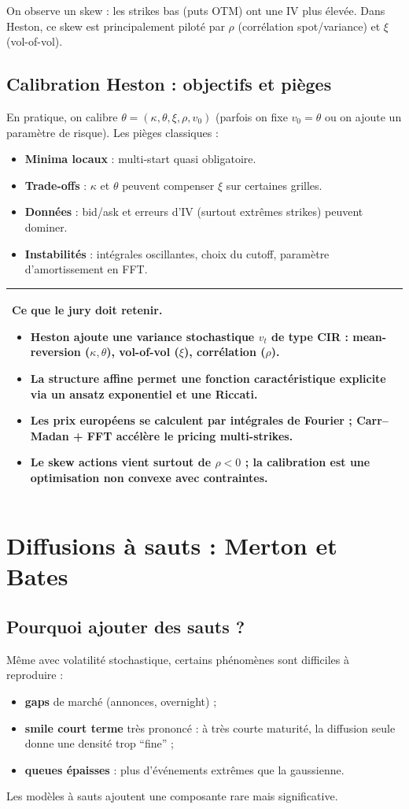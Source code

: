 \documentclass[11pt,a4paper]{report}
\newcommand{\1}{\mathbbm{1}}
\theoremstyle{definition}
\theoremstyle{plain}
\theoremstyle{remark}
\newenvironment{jurybox}{%
  \begin{center}
  \setlength{\tabcolsep}{6pt}%
  \renewcommand{\arraystretch}{1.1}%
  \begin{tabular}{|p{0.94\textwidth}|}
  \hline
  \small\textbf{Ce que le jury doit retenir.}\par\medskip
}{%
  \\ \hline
  \end{tabular}
  \end{center}
}
\begin{document}
On observe un skew : les strikes bas (puts OTM) ont une IV plus élevée.
Dans Heston, ce skew est principalement piloté par $\rho$ (corrélation spot/variance) et $\xi$ (vol-of-vol).

\section{Calibration Heston : objectifs et pièges}
En pratique, on calibre $\theta=(\kappa,\theta,\xi,\rho,v_0)$ (parfois on fixe $v_0=\theta$ ou on ajoute un paramètre de risque).
Les pièges classiques :
\begin{itemize}
  \item \textbf{Minima locaux} : multi-start quasi obligatoire.
  \item \textbf{Trade-offs} : $\kappa$ et $\theta$ peuvent compenser $\xi$ sur certaines grilles.
  \item \textbf{Données} : bid/ask et erreurs d'IV (surtout extrêmes strikes) peuvent dominer.
  \item \textbf{Instabilités} : intégrales oscillantes, choix du cutoff, paramètre d'amortissement en FFT.
\end{itemize}

\begin{jurybox}
\begin{itemize}
\item Heston ajoute une variance stochastique $v_t$ de type CIR : mean-reversion ($\kappa,\theta$), vol-of-vol ($\xi$), corrélation ($\rho$).
\item La structure affine permet une fonction caractéristique explicite via un ansatz exponentiel et une Riccati.
\item Les prix européens se calculent par intégrales de Fourier ; Carr--Madan + FFT accélère le pricing multi-strikes.
\item Le skew actions vient surtout de $\rho<0$ ; la calibration est une optimisation non convexe avec contraintes.
\end{itemize}
\end{jurybox}

\chapter{Diffusions à sauts : Merton et Bates}
\label{chap:jumps}

\section{Pourquoi ajouter des sauts ?}
Même avec volatilité stochastique, certains phénomènes sont difficiles à reproduire :
\begin{itemize}
  \item \textbf{gaps} de marché (annonces, overnight) ;
  \item \textbf{smile court terme} très prononcé : à très courte maturité, la diffusion seule donne une densité trop ``fine'' ;
  \item \textbf{queues épaisses} : plus d'événements extrêmes que la gaussienne.
\end{itemize}
Les modèles à sauts ajoutent une composante rare mais significative.
\end{document}
